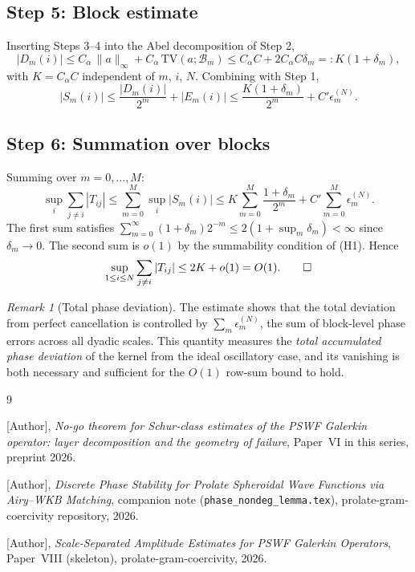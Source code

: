 \documentclass[12pt]{amsart}
\theoremstyle{definition}
\theoremstyle{remark}
\newtheorem{remark}[theorem]{Remark}
\newcommand{\norm}[1]{\lVert#1\rVert}
\begin{document}
\subsection*{Step 5: Block estimate}

Inserting Steps 3--4 into the Abel decomposition
of Step 2,
\[
  |D_m(i)|
  \leq C_\alpha\,\norm{a}_\infty + C_\alpha\,\mathrm{TV}(a;\mathcal{B}_m)
  \leq C_\alpha C + 2C_\alpha C \delta_m
  =: K(1 + \delta_m),
\]
with $K = C_\alpha C$ independent of $m$, $i$, $N$.
Combining with Step 1,
\[
  |S_m(i)|
  \leq \frac{|D_m(i)|}{2^m} + |E_m(i)|
  \leq \frac{K(1+\delta_m)}{2^m} + C'\epsilon_m^{(N)}.
\]

\subsection*{Step 6: Summation over blocks}

Summing over $m = 0, \dots, M$:
\[
  \sup_i \sum_{j \neq i} |T_{ij}|
  \leq \sum_{m=0}^{M} \sup_i |S_m(i)|
  \leq K \sum_{m=0}^{M} \frac{1+\delta_m}{2^m}
     + C'\sum_{m=0}^{M}\epsilon_m^{(N)}.
\]
The first sum satisfies
$\sum_{m=0}^\infty (1+\delta_m)2^{-m}
\leq 2(1 + \sup_m\delta_m) < \infty$
since $\delta_m \to 0$.
The second sum is $o(1)$ by the summability condition of (H1).
Hence
\[
  \sup_{1\leq i\leq N}\sum_{j\neq i}|T_{ij}|
  \leq 2K + o(1) = O(1). \qed
\]

\begin{remark}[Total phase deviation]
The estimate shows that the total deviation from perfect
cancellation is controlled by
$\sum_m \epsilon_m^{(N)}$,
the sum of block-level phase errors across all dyadic scales.
This quantity measures the \emph{total accumulated phase
deviation} of the kernel from the ideal oscillatory case,
and its vanishing is both necessary and sufficient for
the $O(1)$ row-sum bound to hold.
\end{remark}

\begin{thebibliography}{9}

[Author],
\textit{No-go theorem for Schur-class estimates of the PSWF
Galerkin operator: layer decomposition and the geometry
of failure},
Paper~VI in this series, preprint 2026.

[Author],
\textit{Discrete Phase Stability for Prolate Spheroidal Wave
Functions via Airy--WKB Matching},
companion note (\texttt{phase\_nondeg\_lemma.tex}),
prolate-gram-coercivity repository, 2026.

[Author],
\textit{Scale-Separated Amplitude Estimates for PSWF
Galerkin Operators},
Paper~VIII (skeleton), prolate-gram-coercivity, 2026.

\end{thebibliography}
\end{document}
